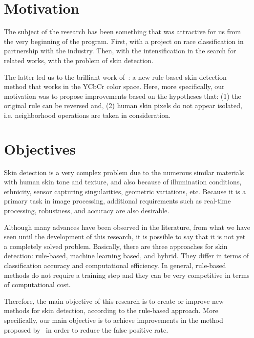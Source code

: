 \section{Motivation}
\label{sec:motivation}

The subject of the research has been something that was attractive for us from the very beginning of the program. First, with a project on race classification in partnership with the industry. Then, with the intensification in the search for related works, with the problem of skin detection.

The latter led us to the brilliant work of~\citet{brancati:17}: a new rule-based skin detection method that works in the YCbCr color space. Here, more specifically, our motivation was to propose improvements based on the hypotheses that: (1) the original rule can be reversed and, (2) human skin pixels do not appear isolated, i.e. neighborhood operations are taken in consideration.


\section{Objectives}
\label{sec:objectives}

Skin detection is a very complex problem due to the numerous similar materials with human skin tone and texture, and also because of illumination conditions, ethnicity, sensor capturing singularities, geometric variations, etc. Because it is a primary task in image processing, additional requirements such as real-time processing, robustness, and accuracy are also desirable.

Although many advances have been observed in the literature, from what we have seen until the development of this research, it is possible to say that it is not yet a completely solved problem. Basically, there are three approaches for skin detection: rule-based, machine learning based, and hybrid. They differ in terms of classification accuracy and computational efficiency. In general, rule-based methods do not require a training step and they can be very competitive in terms of computational cost.

Therefore, the main objective of this research is to create or improve new methods for skin detection, according to the rule-based approach. More specifically, our main objective is to achieve improvements in the method proposed by~\citet{brancati:17} in order to reduce the false positive rate.


